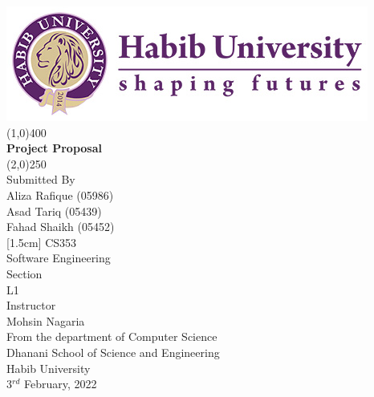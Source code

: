 \begin{titlepage}
\thispagestyle{empty}
\begin{center}
\includegraphics[scale=0.40]{Figures/HU-LOGO--01.jpg}
\line(1,0){400}\\
[2mm]
\selectfont
\textbf{Project Proposal}\\
\line(2,0){250}\\
[0.5cm]
Submitted By\\
Aliza Rafique (05986)\\
Asad Tariq (05439)\\
Fahad Shaikh (05452)\\
[1.5cm]
CS353\\
Software Engineering\\ 
[1.0cm]
Section\\
L1\\
[1.0cm]
Instructor\\
Mohsin Nagaria\\
[1.5cm]
From the department of Computer Science\\
Dhanani School of Science and Engineering\\
Habib University\\
3$^{rd}$ February, 2022
\end{center} 
\end{titlepage}